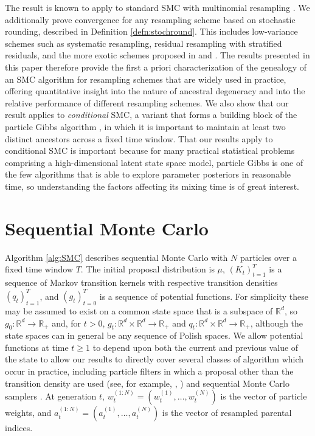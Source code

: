 \documentclass{article} %
\theoremstyle{definition}
\newcommand{\1}[1]{\mathbbm{1}_{\{#1\}}}
\begin{document}
The result is known to apply to standard SMC with multinomial resampling \cite[Corollary 1]{koskela2018}. 
We additionally prove convergence for any resampling scheme based on stochastic rounding, described in Definition \ref{defn:stochround}. This includes low-variance schemes such as systematic resampling, residual resampling with stratified residuals, and the more exotic schemes proposed in \cite{crisan1997} and \cite{gerber2017}. The results presented in this paper therefore provide the first a priori characterization of the genealogy of an SMC algorithm for resampling schemes that are widely used in practice, offering quantitative insight into the nature of ancestral degeneracy and into the relative performance of different resampling schemes. We also show that our result applies to \emph{conditional} SMC, a variant that forms a building block of the particle Gibbs algorithm \cite{andrieu2010}, in which it is important to maintain at least two distinct ancestors across a fixed time window. That our results apply to conditional SMC is important because for many practical statistical problems comprising a high-dimensional latent state space model, particle Gibbs is one of the few algorithms that is able to explore parameter posteriors in reasonable time, so understanding the factors affecting its mixing time is of great interest.

\section{Sequential Monte Carlo}
Algorithm \ref{alg:SMC} describes sequential Monte Carlo with $N$ particles over a fixed time window $T$.
The initial proposal distribution is $\mu$, $(K_t)_{t=1}^T$ is a sequence of Markov transition kernels with respective transition densities $(q_t)_{t=1}^T$, and $(g_t)_{t=0}^T$ is a sequence of potential functions.
For simplicity these may be assumed to exist on a common state space that is a subspace of $\mathbb{R}^d$, so $g_0: \mathbb{R}^d \to \mathbb{R}_+$ and, for $t>0$, $g_t: \mathbb{R}^d \times\mathbb{R}^d \to \mathbb{R}_+$ and $q_t: \mathbb{R}^d \times\mathbb{R}^d \to \mathbb{R}_+$,
although the state spaces can in general be any sequence of Polish spaces. We allow potential functions at time $t \geq 1$ to depend upon both the current and previous value of the state to allow our results to directly cover several classes of algorithm which occur in practice, including particle filters in which a proposal other than the transition density are used (see, for example, \cite[Section 4.1]{doucet2009}, \cite[Section 10.3.2]{chopin2020}) and sequential Monte Carlo samplers \cite{delmoral2006}.
At generation $t$, $w_t^{(1:N)} = (w_t^{(1)},\ldots,w_t^{(N)})$ is the vector of particle weights, and $a_t^{(1:N)} = (a_t^{(1)},\ldots,a_t^{(N)})$ is the vector of resampled parental indices.
\end{document}
